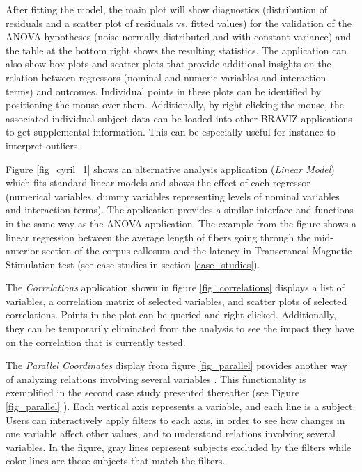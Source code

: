 \documentclass{frontiersHLTH}
\begin{document}
After fitting the model, the main plot will show diagnostics (distribution of residuals and a scatter plot of residuals vs. fitted values) for the validation of the ANOVA hypotheses (noise normally distributed and with constant variance) and the table at the bottom right shows the resulting statistics. The application can also show box-plots and scatter-plots that provide additional insights on the relation between regressors (nominal and numeric variables and interaction terms) and outcomes. Individual points in these plots can be identified by positioning the mouse over them. Additionally, by right clicking the mouse, the associated individual subject data can be loaded into other BRAVIZ applications to get supplemental information. This can be especially useful for instance to interpret outliers.

Figure \ref{fig_cyril_1} shows an alternative analysis application (\emph{Linear Model}) which fits standard linear models and shows the effect of each regressor (numerical variables, dummy variables representing levels of nominal variables and interaction terms). The application provides a similar interface and functions in the same way as the ANOVA application. The example from the figure shows a linear regression between the average length of fibers going through the mid-anterior section of the corpus callosum and the latency in Transcraneal Magnetic Stimulation test (see case studies in section \ref{case_studies}).  

The \emph{Correlations} application shown in figure \ref{fig_correlations} displays a list of variables, a correlation matrix of selected variables, and scatter plots of selected correlations. Points in the plot can be queried and right clicked. Additionally, they can be temporarily eliminated from the analysis to see the impact they have on the correlation that is currently tested. 

The \emph{Parallel Coordinates} display from figure \ref{fig_parallel} provides another way of analyzing relations involving several variables . This functionality is exemplified in the second case study presented thereafter (see Figure \ref{fig_parallel} ). Each vertical axis represents a variable, and each line is a subject. Users can interactively apply filters to each axis, in order to see how changes in one variable affect other values, and to understand relations involving several variables. In the figure, gray lines represent subjects excluded by the filters while color lines are those subjects that match the filters.
\end{document}
